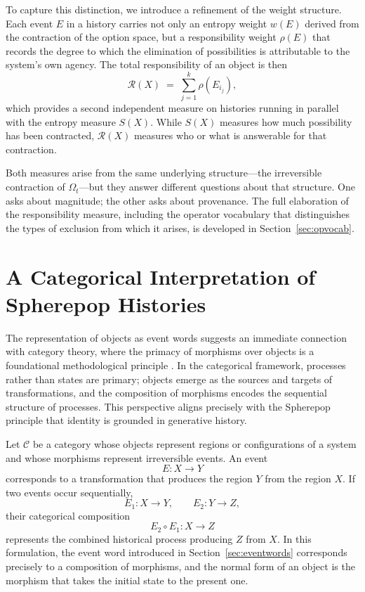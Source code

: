 \documentclass[12pt]{article}
\theoremstyle{plain}
\theoremstyle{definition}
\theoremstyle{remark}
\begin{document}
To capture this distinction, we introduce a refinement of the weight structure.
Each event $E$ in a history carries not only an entropy weight $w(E)$ derived
from the contraction of the option space, but a responsibility weight $\rho(E)$
that records the degree to which the elimination of possibilities is attributable
to the system's own agency.  The total responsibility of an object is then
\[
  \mathcal{R}(X) \;=\; \sum_{j=1}^{k} \rho(E_{i_j}),
\]
which provides a second independent measure on histories running in parallel
with the entropy measure $S(X)$.  While $S(X)$ measures how much possibility
has been contracted, $\mathcal{R}(X)$ measures who or what is answerable for
that contraction.

Both measures arise from the same underlying structure---the irreversible
contraction of $\Omega_t$---but they answer different questions about that
structure.  One asks about magnitude; the other asks about provenance.  The
full elaboration of the responsibility measure, including the operator
vocabulary that distinguishes the types of exclusion from which it arises, is
developed in Section~\ref{sec:opvocab}.
\section{A Categorical Interpretation of Spherepop Histories}
\label{sec:categorical}

The representation of objects as event words suggests an immediate connection
with category theory, where the primacy of morphisms over objects is a
foundational methodological principle \citep{MacLane1998}.  In the categorical
framework, processes rather than states are primary; objects emerge as the
sources and targets of transformations, and the composition of morphisms
encodes the sequential structure of processes.  This perspective aligns
precisely with the Spherepop principle that identity is grounded in generative
history.

Let $\mathcal{C}$ be a category whose objects represent regions or
configurations of a system and whose morphisms represent irreversible events.
An event
\[
  E : X \rightarrow Y
\]
corresponds to a transformation that produces the region $Y$ from the region
$X$.  If two events occur sequentially,
\[
  E_1 : X \rightarrow Y, \qquad E_2 : Y \rightarrow Z,
\]
their categorical composition
\[
  E_2 \circ E_1 : X \rightarrow Z
\]
represents the combined historical process producing $Z$ from $X$.  In this
formulation, the event word introduced in Section~\ref{sec:eventwords}
corresponds precisely to a composition of morphisms, and the normal form of
an object is the morphism that takes the initial state to the present one.
\end{document}
